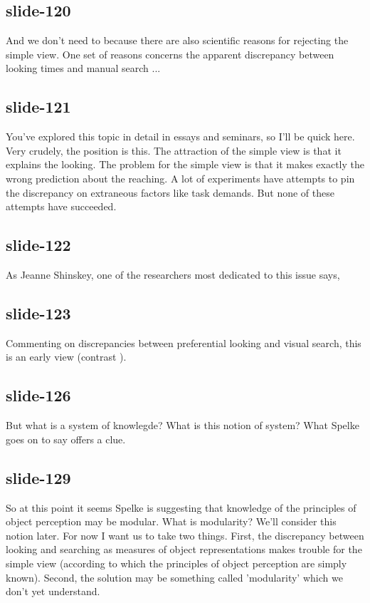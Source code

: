 \documentclass[12pt,\papersize]{extarticle}
\begin{document}
 
\subsection{slide-120}
And we don't need to because there are also scientific reasons for rejecting the simple view.
One set of reasons concerns the apparent discrepancy between looking times and manual search ...
 
 
\subsection{slide-121}
You've explored this topic in detail in essays and seminars, so I'll be quick here.
Very crudely, the position is this.
The attraction of the simple view is that it explains the looking.
The problem for the simple view is that it makes exactly the wrong prediction about the reaching.
A lot of experiments have attempts to pin the discrepancy on extraneous factors like task demands.
But none of these attempts have succeeded.
 
 
\subsection{slide-122}
As Jeanne Shinskey, one of the researchers most dedicated to this issue says,
 
 
\subsection{slide-123}
Commenting on discrepancies between preferential looking and visual search, this is an early view (contrast \citealp{Spelke:2001pg}).
 
 
\subsection{slide-126}
But what is a system of knowlegde? What is this notion of system?
What Spelke goes on to say offers a clue.
 
 
\subsection{slide-129}
So at this point it seems Spelke is suggesting that knowledge of the principles of object perception may be modular.
What is modularity? We'll consider this notion later.
For now I want us to take two things.
First, the discrepancy between looking and searching as measures of object representations makes trouble for the simple view (according to which the principles of object perception are simply known).
Second, the solution may be something called 'modularity' which we don't yet understand.
 
\end{document}

